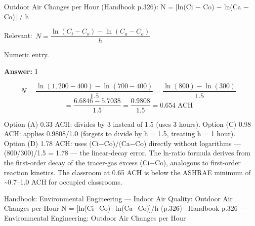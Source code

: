 \documentclass[11pt]{article}
\begin{document}
Outdoor Air Changes per Hour (Handbook p.326):
N = [ln(Ci $-$ Co) $-$ ln(Ca $-$ Co)] / h\par\vspace{3pt}
{\small\color{soft}Relevant:}\ $N = \dfrac{\ln(C_i - C_o) - \ln(C_a - C_o)}{h}$\par\vspace{3pt}
{\small\color{soft}Numeric entry.}\par\vspace{3pt}
\vspace{2pt}\par\noindent\colorbox{boxbg}{\parbox{\dimexpr\linewidth-2\fboxsep\relax}{%
\vspace{2pt}\textbf{Answer:} 1\par\vspace{2pt}
{\small \[N = \frac{\ln(1{,}200 - 400) - \ln(700 - 400)}{1.5} = \frac{\ln(800) - \ln(300)}{1.5}\]
\[= \frac{6.6846 - 5.7038}{1.5} = \frac{0.9808}{1.5} = 0.654\;\text{ACH}\]

Option (A) 0.33 ACH: divides by 3 instead of 1.5 (uses 3 hours). Option (C) 0.98 ACH: applies 0.9808/1.0 (forgets to divide by h = 1.5, treating h = 1 hour). Option (D) 1.78 ACH: uses (Ci$-$Co)/(Ca$-$Co) directly without logarithms --- (800/300)/1.5 = 1.78 --- the linear-decay error. The ln-ratio formula derives from the first-order decay of the tracer-gas excess (Ci$-$Co), analogous to first-order reaction kinetics. The classroom at 0.65 ACH is below the ASHRAE minimum of \textasciitilde{}0.7--1.0 ACH for occupied classrooms.}\par\vspace{2pt}
{\footnotesize\color{soft}Handbook: Environmental Engineering --- Indoor Air Quality: Outdoor Air Changes per Hour N = [ln(Ci$-$Co)$-$ln(Ca$-$Co)]/h (p.326) \textbullet\ Handbook p.326 --- Environmental Engineering: Outdoor Air Changes per Hour}\vspace{2pt}
}}
\vspace{9pt}
\end{document}
